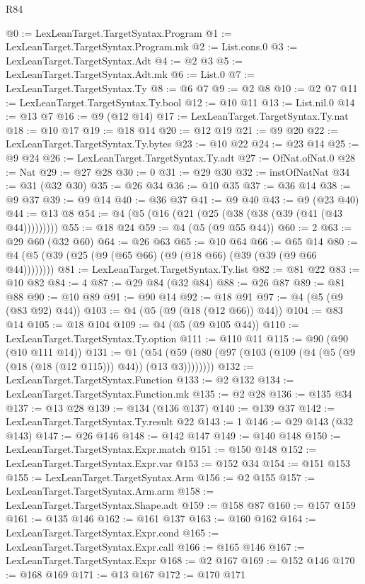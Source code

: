 \begin{lexlean}{R84}
\begin{coremodule}
@0 := LexLeanTarget.TargetSyntax.Program
@1 := LexLeanTarget.TargetSyntax.Program.mk
@2 := List.cons.{0}
@3 := LexLeanTarget.TargetSyntax.Adt
@4 := @2 @3
@5 := LexLeanTarget.TargetSyntax.Adt.mk
@6 := List.{0}
@7 := LexLeanTarget.TargetSyntax.Ty
@8 := @6 @7
@9 := @2 @8
@10 := @2 @7
@11 := LexLeanTarget.TargetSyntax.Ty.bool
@12 := @10 @11
@13 := List.nil.{0}
@14 := @13 @7
@16 := @9 (@12 @14)
@17 := LexLeanTarget.TargetSyntax.Ty.nat
@18 := @10 @17
@19 := @18 @14
@20 := @12 @19
@21 := @9 @20
@22 := LexLeanTarget.TargetSyntax.Ty.bytes
@23 := @10 @22
@24 := @23 @14
@25 := @9 @24
@26 := LexLeanTarget.TargetSyntax.Ty.adt
@27 := OfNat.ofNat.{0}
@28 := Nat
@29 := @27 @28
@30 := 0
@31 := @29 @30
@32 := instOfNatNat
@34 := @31 (@32 @30)
@35 := @26 @34
@36 := @10 @35
@37 := @36 @14
@38 := @9 @37
@39 := @9 @14
@40 := @36 @37
@41 := @9 @40
@43 := @9 (@23 @40)
@44 := @13 @8
@54 := @4 (@5 (@16 (@21 (@25 (@38 (@38 (@39 (@41 (@43 @44)))))))))
@55 := @18 @24
@59 := @4 (@5 (@9 @55 @44))
@60 := 2
@63 := @29 @60 (@32 @60)
@64 := @26 @63
@65 := @10 @64
@66 := @65 @14
@80 := @4 (@5 (@39 (@25 (@9 (@65 @66) (@9 (@18 @66) (@39 (@39 (@9 @66 @44))))))))
@81 := LexLeanTarget.TargetSyntax.Ty.list
@82 := @81 @22
@83 := @10 @82
@84 := 4
@87 := @29 @84 (@32 @84)
@88 := @26 @87
@89 := @81 @88
@90 := @10 @89
@91 := @90 @14
@92 := @18 @91
@97 := @4 (@5 (@9 (@83 @92) @44))
@103 := @4 (@5 (@9 (@18 (@12 @66)) @44))
@104 := @83 @14
@105 := @18 @104
@109 := @4 (@5 (@9 @105 @44))
@110 := LexLeanTarget.TargetSyntax.Ty.option
@111 := @110 @11
@115 := @90 (@90 (@10 @111 @14))
@131 := @1 (@54 (@59 (@80 (@97 (@103 (@109 (@4 (@5 (@9 (@18 (@18 (@12 @115))) @44)) (@13 @3))))))))
@132 := LexLeanTarget.TargetSyntax.Function
@133 := @2 @132
@134 := LexLeanTarget.TargetSyntax.Function.mk
@135 := @2 @28
@136 := @135 @34
@137 := @13 @28
@139 := @134 (@136 @137)
@140 := @139 @37
@142 := LexLeanTarget.TargetSyntax.Ty.result @22
@143 := 1
@146 := @29 @143 (@32 @143)
@147 := @26 @146
@148 := @142 @147
@149 := @140 @148
@150 := LexLeanTarget.TargetSyntax.Expr.match
@151 := @150 @148
@152 := LexLeanTarget.TargetSyntax.Expr.var
@153 := @152 @34
@154 := @151 @153
@155 := LexLeanTarget.TargetSyntax.Arm
@156 := @2 @155
@157 := LexLeanTarget.TargetSyntax.Arm.arm
@158 := LexLeanTarget.TargetSyntax.Shape.adt
@159 := @158 @87
@160 := @157 @159
@161 := @135 @146
@162 := @161 @137
@163 := @160 @162
@164 := LexLeanTarget.TargetSyntax.Expr.cond
@165 := LexLeanTarget.TargetSyntax.Expr.call
@166 := @165 @146
@167 := LexLeanTarget.TargetSyntax.Expr
@168 := @2 @167
@169 := @152 @146
@170 := @168 @169
@171 := @13 @167
@172 := @170 @171

\end{coremodule}
\end{lexlean}
